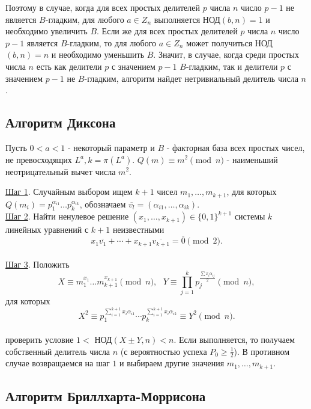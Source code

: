 \documentclass[bachelor, och, labwork]{shiza}
\begin{document}
        Поэтому в случае, когда для всех простых делителей $p$ числа $n$ число
        $p - 1$ не является $B$-гладким, для любого $a \in Z_n$ выполняется
        НОД$(b,n) = 1$ и необходимо увеличить $B$. Если же для всех простых
        делителей $p$ числа $n$ число $p - 1$ является $B$-гладким, то для
        любого $a \in Z_n$ может получиться НОД$(b, n) = n$ и необходимо
        уменьшить $B$. Значит, в случае, когда среди простых числа $n$ есть как
        делители $p$ с значением $p - 1$ $B$-гладким, так и делители $p$ с
        значением $p - 1$ не $B$-гладким, алгоритм найдет нетривиальный делитель
        числа $n$.

    \subsection{Алгоритм Диксона}
    
        Пусть $0 < a < 1$ - некоторый параметр и $B$ - факторная база всех
        простых чисел, не превосходящих $L^{a}, k = \pi(L^a)$. $Q(m) \equiv m^2
        \pmod n$ - наименьший неотрицательный вычет числа $m^2$.

        \underline{Шаг 1}. Случайным выбором ищем $k + 1$ чисел $m_1, \dots,
        m_{k + 1}$, для которых $Q(m_i) = p_1^{\alpha_{i1}} \dots
        p_k^{\alpha_{ik}}$, обозначаем $\overline{v_l} = (\alpha_{i1}, \dots,
        \alpha_{ik}).$\\
        \underline{Шаг 2}. Найти ненулевое решение $(x_1, \dots, x_{k + 1}) \in
        \{0,1\}^{k + 1}$ системы $k$ линейных уравнений с $k + 1$ неизвестными
        $$x_1 \overline{v_1} + \cdots + x_{k + 1} \overline{v_{k + 1}} =
        \overline{0} \pmod 2.$$\\
        \underline{Шаг 3}. Положить $$X \equiv m_1^{x_1} \dots m_{k + 1}^{x_{k +
        1}} \pmod n, \text{ } Y \equiv \prod_{j=1}^{k} p_j^{\frac{\sum x_i
        \alpha_{ij}}{2}} \pmod n,$$ для которых $$X^2 \equiv
        p_1^{\sum^{k+1}_{i=1} x_i \alpha_{i1}} \cdots p_k^{\sum^{k+1}_{i=1} x_i
        \alpha_{ik}} \equiv Y^2 \pmod n.$$\\

        проверить условие $1 <$ НОД$(X \pm Y, n) < n$. Если выполняется, то
        получаем собственный делитель числа $n$ (с вероятностью успеха $P_0 \geq
        \frac{1}{2}$). В противном случае возвращаемся на шаг $1$ и выбираем
        другие значения $m_1, \dots, m_{k+1}.$

    \subsection{Алгоритм Бриллхарта-Моррисона}
\end{document}
